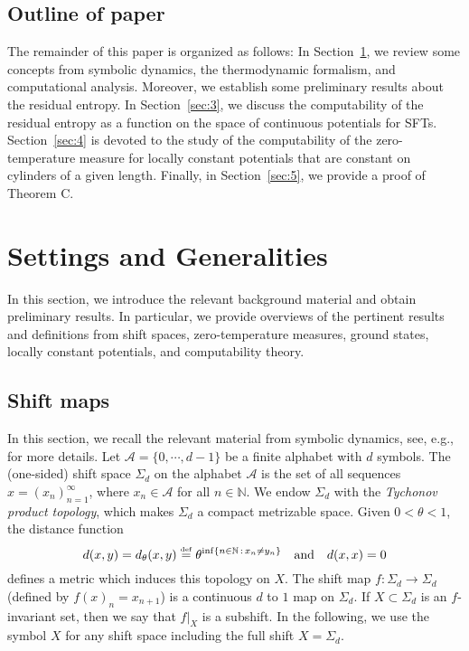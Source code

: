 \documentclass[11pt, reqno]{amsart}
\newcommand{\eqdef}{\stackrel{\scriptscriptstyle\rm def}{=}}
\newcommand{\bN}{{\mathbb N}}
\newcommand{\cA}{{\mathcal A}}
\begin{document}
 \subsection{Outline of paper}
 
The remainder of this paper is organized as follows: In Section~\ref{sec:2}, we review some
 concepts from symbolic dynamics, the thermodynamic formalism, and computational analysis. Moreover, we establish some preliminary results about the residual entropy.
In Section~\ref{sec:3}, we discuss the computability of the residual entropy as a function on the space of continuous potentials for SFTs. 
Section~\ref{sec:4} is devoted to the study of the computability of the zero-temperature measure for locally constant potentials that are constant on cylinders of a given length. 
 Finally, in Section~\ref{sec:5}, we provide a proof of Theorem C.


\section{Settings and Generalities}\label{sec:2}

In this section, we introduce the relevant background material and obtain preliminary results.  In particular, we provide overviews of the pertinent results and definitions from shift spaces, zero-temperature measures, ground states, locally constant potentials, and computability theory.



\subsection{Shift maps}

In this section, we recall the relevant material from symbolic dynamics, see, e.g., \cite{Kit} for more details.  Let $\cA=\{0,\cdots,d-1\}$ be a finite alphabet with $d$ symbols. The (one-sided) shift space $\Sigma_d$ on the alphabet $\cA$ is the set of
all sequences $x=(x_n)_{n=1}^\infty$, where $x_n\in \cA$ for all $n\in \bN$.  We endow $\Sigma_d$ with the {\em Tychonov product topology},
which makes $\Sigma_d$ a compact metrizable space. Given $0<\theta<1$, the distance function
\begin{equation}\label{defmet}
d(x,y)=d_\theta(x,y)\eqdef\theta^{\inf\{n\in \bN\,:\,x_n\not=y_n\}}\quad {\rm and}\quad d(x,x)=0
\end{equation}
defines a metric which induces this topology on $X$.
The shift map $f:\Sigma_d\to \Sigma_d$ (defined by $f(x)_n=x_{n+1}$) is a continuous $d$ to $1$ map on $\Sigma_d$.
If $X\subset \Sigma_d$ is an $f$-invariant set, then we  say  that $f|_X$ is a subshift. In the following, we use the symbol $X$ for any shift space including the full shift $X=\Sigma_d$.
\end{document}
